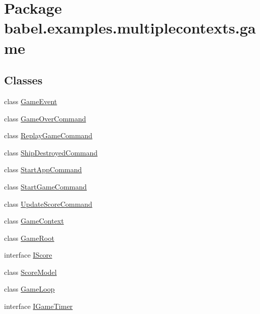 \hypertarget{namespacebabel_1_1examples_1_1multiplecontexts_1_1game}{\section{Package babel.\-examples.\-multiplecontexts.\-game}
\label{namespacebabel_1_1examples_1_1multiplecontexts_1_1game}
}
\subsection*{Classes}
\begin{DoxyCompactItemize}
\item 
class \hyperlink{classbabel_1_1examples_1_1multiplecontexts_1_1game_1_1_game_event}{Game\-Event}
\item 
class \hyperlink{classbabel_1_1examples_1_1multiplecontexts_1_1game_1_1_game_over_command}{Game\-Over\-Command}
\item 
class \hyperlink{classbabel_1_1examples_1_1multiplecontexts_1_1game_1_1_replay_game_command}{Replay\-Game\-Command}
\item 
class \hyperlink{classbabel_1_1examples_1_1multiplecontexts_1_1game_1_1_ship_destroyed_command}{Ship\-Destroyed\-Command}
\item 
class \hyperlink{classbabel_1_1examples_1_1multiplecontexts_1_1game_1_1_start_app_command}{Start\-App\-Command}
\item 
class \hyperlink{classbabel_1_1examples_1_1multiplecontexts_1_1game_1_1_start_game_command}{Start\-Game\-Command}
\item 
class \hyperlink{classbabel_1_1examples_1_1multiplecontexts_1_1game_1_1_update_score_command}{Update\-Score\-Command}
\item 
class \hyperlink{classbabel_1_1examples_1_1multiplecontexts_1_1game_1_1_game_context}{Game\-Context}
\item 
class \hyperlink{classbabel_1_1examples_1_1multiplecontexts_1_1game_1_1_game_root}{Game\-Root}
\item 
interface \hyperlink{interfacebabel_1_1examples_1_1multiplecontexts_1_1game_1_1_i_score}{I\-Score}
\item 
class \hyperlink{classbabel_1_1examples_1_1multiplecontexts_1_1game_1_1_score_model}{Score\-Model}
\item 
class \hyperlink{classbabel_1_1examples_1_1multiplecontexts_1_1game_1_1_game_loop}{Game\-Loop}
\item 
interface \hyperlink{interfacebabel_1_1examples_1_1multiplecontexts_1_1game_1_1_i_game_timer}{I\-Game\-Timer}

\end{DoxyCompactItemize}
